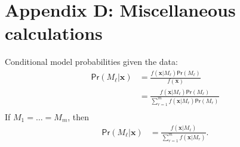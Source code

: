 \documentclass{uwstat572}
\newcommand*\ba{\[ \begin{aligned}}
\newcommand*\ea{\end{aligned} \]}
\newcommand*\bx{\mathbf{x}}
\renewcommand\;{\,}
\renewcommand\Pr[1]{ \mathsf{Pr}\left(#1\right) }
\begin{document}
\section*{Appendix D: Miscellaneous calculations}
Conditional model probabilities given the data:
\ba
\Pr{M_\ell | \bx} & = \frac{f(\bx | M_\ell) \Pr{M_\ell}}{ f(\bx) } \\
	& = \frac{f(\bx | M_\ell) \Pr{M_\ell}}{ \sum_{r = 1}^m f(\bx | M_r) \Pr{M_r} } \\
\ea
If $M_1 = \dotsc = M_m$, then
\ba
\Pr{M_\ell | \bx} & = \frac{f(\bx | M_\ell)}{ \sum_{r=1}^m f(\bx | M_r) }.
\ea
\end{document}
